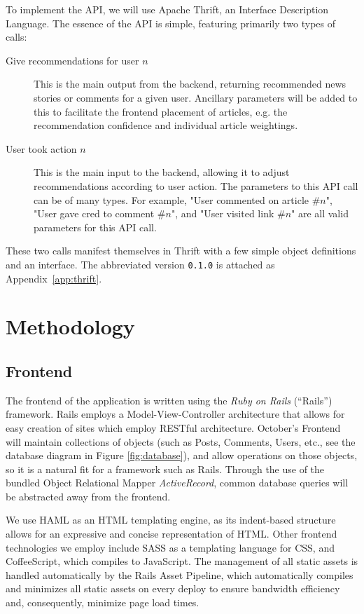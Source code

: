 \documentclass[11pt,letterpaper]{article}
\begin{document}
To implement the API, we will use Apache Thrift, an Interface Description Language\cite{thrift}.
The essence of the API is simple, featuring primarily two types of calls:
\begin{description}
\item[Give recommendations for user $n$]
This is the main output from the backend, returning recommended news stories or comments for a given user.
Ancillary parameters will be added to this to facilitate the frontend placement of articles, e.g. the recommendation confidence and individual article weightings.
\item[User took action $n$]
This is the main input to the backend, allowing it to adjust recommendations according to user action.
The parameters to this API call can be of many types. For example, "User commented on article \#$n$", "User gave cred to comment \#$n$", and "User visited link \#$n$" are all valid parameters for this API call.
\end{description}

These two calls manifest themselves in Thrift with a few simple object
definitions and an interface.  The abbreviated version \texttt{0.1.0} is
attached as Appendix~\ref{app:thrift}.

\section{Methodology}
\subsection{Frontend}
The frontend of the application is written using the \textit{Ruby on Rails} (``Rails'') framework.
Rails employs a Model-View-Controller architecture that allows for easy creation of sites which employ RESTful architecture.
October's Frontend will maintain collections of objects (such as Posts, Comments, Users, etc., see the database diagram in Figure \ref{fig:database}), and allow operations on those objects, so it is a natural fit for a framework such as Rails.
Through the use of the bundled Object Relational Mapper \textit{ActiveRecord}, common database queries will be abstracted away from the frontend.

We use HAML as an HTML templating engine, as its indent-based structure allows for an expressive and concise representation of HTML.
Other frontend technologies we employ include SASS as a templating language for CSS, and CoffeeScript, which compiles to JavaScript.
The management of all static assets is handled automatically by the Rails Asset Pipeline, which automatically compiles and minimizes all static assets on every deploy to ensure bandwidth efficiency and, consequently, minimize page load times.
\end{document}
